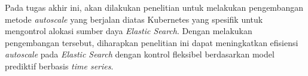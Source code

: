 Pada tugas akhir ini, akan dilakukan penelitian untuk melakukan pengembangan metode \textit{autoscale} yang berjalan diatas Kubernetes yang spesifik untuk mengontrol alokasi sumber daya \textit{Elastic Search}. Dengan melakukan pengembangan tersebut, diharapkan penelitian ini dapat meningkatkan efisiensi \textit{autoscale} pada \textit{Elastic Search} dengan kontrol fleksibel berdasarkan model prediktif berbasis \textit{time series}.

